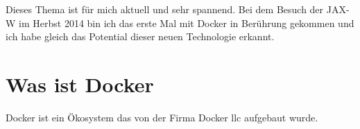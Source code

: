 Dieses Thema ist für mich aktuell und sehr spannend.
Bei dem Besuch der JAX-W im Herbst 2014 bin ich das erste Mal mit Docker
in Berührung gekommen und ich habe gleich das Potential dieser neuen
Technologie erkannt.

\section{Was ist Docker}
Docker ist ein Ökosystem das von der Firma Docker llc aufgebaut wurde.